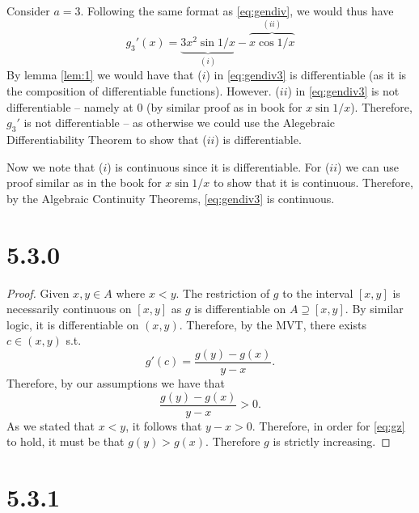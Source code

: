 \documentclass[10pt]{article}
\begin{document}
Consider $a=3.$ Following the same format as \eqref{eq:gendiv}, we would thus have
\begin{equation} \label{eq:gendiv3}
    g_3'(x) = \underbrace{3x^{2}\sin 1/x}_{(i)} - \overbrace{x \cos1/x}^{(ii)}
\end{equation}
By lemma \ref{lem:1} we would have that ($i$) in \eqref{eq:gendiv3} is differentiable (as it is the composition of differentiable functions). However. ($ii$) in \eqref{eq:gendiv3} is not differentiable -- namely at $0$ (by similar proof as in book for $x\sin 1/x$). Therefore, $g_3'$ is not differentiable -- as otherwise we could use the Alegebraic Differentiability Theorem to show that ($ii$) is differentiable.

Now we note that ($i$) is continuous since it is differentiable. For ($ii$) we can use proof similar as in the book for $x\sin 1/x$ to show that it is continuous. Therefore, by the Algebraic Continuity Theorems, \eqref{eq:gendiv3} is continuous.

\section*{5.3.0}



\begin{proof}
    Given $x,y\in A$ where $x<y$. The restriction of $g$ to the interval $[x,y]$ is necessarily continuous on $[x,y]$ as $g$ is differentiable on $A\supseteq [x,y].$ By similar logic, it is differentiable on $(x,y).$ Therefore, by the MVT, there exists $c\in (x,y)$ s.t.
    \begin{equation*}
        g'(c) = \frac{g(y)-g(x)}{y-x}.
    \end{equation*}
    Therefore, by our assumptions we have that
    \begin{equation} \label{eq:gz}
        \frac{g(y)-g(x)}{y-x} > 0.
    \end{equation}
    As we stated that $x<y$, it follows that $y-x > 0.$ Therefore, in order for \eqref{eq:gz} to hold, it must be that $g(y)>g(x).$ Therefore $g$ is strictly increasing.
\end{proof}

\section*{5.3.1}
\end{document}
